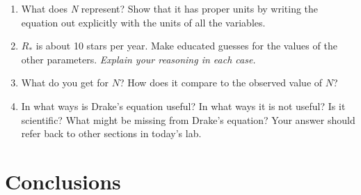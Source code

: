 \documentclass[10pt]{article}%
\begin{document}
\begin{enumerate}

\item  What does \emph{N} represent?  
Show that it has proper units by writing the equation out explicitly with the units of all the variables.

\item  $R_{*}$ is about 10 stars per year.  
Make educated guesses for the values of the other parameters.  \emph{Explain your reasoning in each case.}

\item  What do you get for $N$?  How does it compare to the observed value of $N$?

\item In what ways is Drake's equation useful?  
In what ways it is not useful?  Is it scientific?  
What might be missing from Drake's equation?  
Your answer should refer back to other sections in today's lab.

\end{enumerate}


\section{Conclusions}
\end{document}
